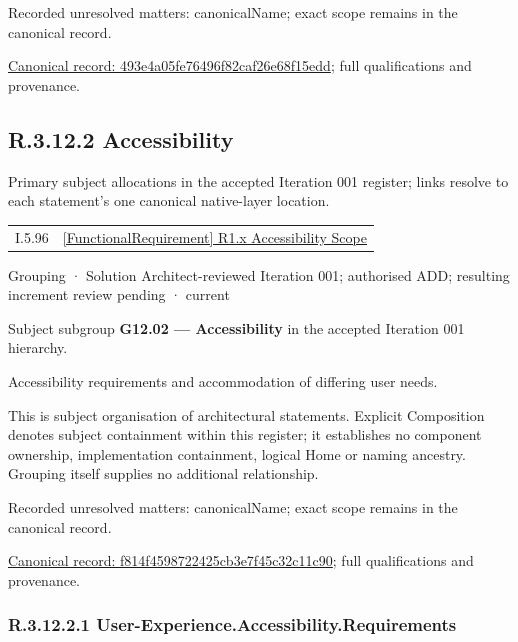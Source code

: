 {\small Recorded unresolved matters: canonicalName; exact scope remains in the canonical record.}\par
{\footnotesize \href{../../../../continuum/grouping/493e4a05fe76496f82caf26e68f15edd.md}{Canonical record: 493e4a05fe76496f82caf26e68f15edd}; full qualifications and provenance.}\par
\subsection*{R.3.12.2 Accessibility}
\label{navigation:R.3.12.2}

Primary subject allocations in the accepted Iteration 001 register; links resolve to each statement’s one canonical native-layer location.\par
\begin{longtable}{p{.22\linewidth}p{.73\linewidth}}
I.5.96 & \hyperref[element:8369e22bc3414ae49a1987095549ef03]{[FunctionalRequirement] R1.x Accessibility Scope} \\
\end{longtable}
\label{element:f814f4598722425cb3e7f45c32c11c90}
{\small Grouping · Solution Architect-reviewed Iteration 001; authorised ADD; resulting increment review pending · current}\par

Subject subgroup \textbf{G12.02 — Accessibility} in the accepted Iteration 001 hierarchy.



Accessibility requirements and accommodation of differing user needs.



This is subject organisation of architectural statements. Explicit Composition denotes subject containment within this register; it establishes no component ownership, implementation containment, logical Home or naming ancestry. Grouping itself supplies no additional relationship.


{\small Recorded unresolved matters: canonicalName; exact scope remains in the canonical record.}\par
{\footnotesize \href{../../../../continuum/grouping/f814f4598722425cb3e7f45c32c11c90.md}{Canonical record: f814f4598722425cb3e7f45c32c11c90}; full qualifications and provenance.}\par
\subsubsection*{R.3.12.2.1 User-Experience.Accessibility.Requirements}
\label{navigation:R.3.12.2.1}

